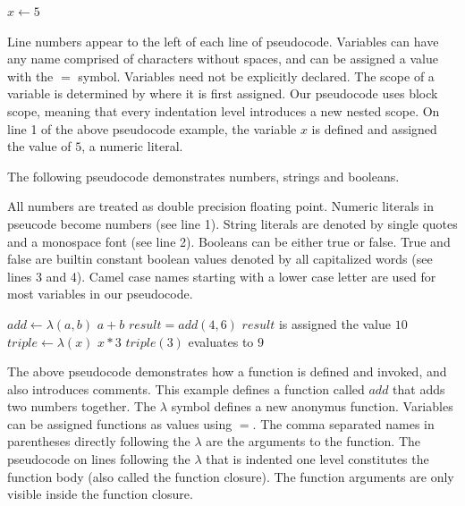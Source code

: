 \begin{codebox}
\li $x \gets 5$
\end{codebox}

Line numbers appear to the left of each line of pseudocode. Variables can have any name comprised of characters without spaces, and can be assigned a value with the $=$ symbol. Variables need not be explicitly declared. The scope of a variable is determined by where it is first assigned. Our pseudocode uses block scope, meaning that every indentation level introduces a new nested scope. On line 1 of the above pseudocode example, the variable $x$ is defined and assigned the value of $5$, a numeric literal.

The following pseudocode demonstrates numbers, strings and booleans.


All numbers are treated as double precision floating point. Numeric literals in pseucode become numbers (see line 1). String literals are denoted by single quotes and a monospace font (see line 2). Booleans can be either true or false. True and false are builtin constant boolean values denoted by all capitalized words (see lines 3 and 4). Camel case names starting with a lower case letter are used for most variables in our pseudocode.

\begin{codebox}
\li $add \gets \lambda(a, b)$
\Do
\li \Return $ a + b $
\End
\li $result = add(4, 6)$ \Comment $result$ is assigned the value $10$
\li $triple \gets \lambda(x)$ \Return $ x * 3 $
\li $triple(3)$ \Comment evaluates to $9$
\end{codebox}

The above pseudocode demonstrates how a function is defined and invoked, and also introduces comments. This example defines a function called $add$ that adds two numbers together. The $\lambda$ symbol defines a new anonymus function. Variables can be assigned functions as values using $=$. The comma separated names in parentheses directly following the $\lambda$ are the arguments to the function. The pseudocode on lines following the $\lambda$ that is indented one level constitutes the function body (also called the function closure). The function arguments are only visible inside the function closure.

